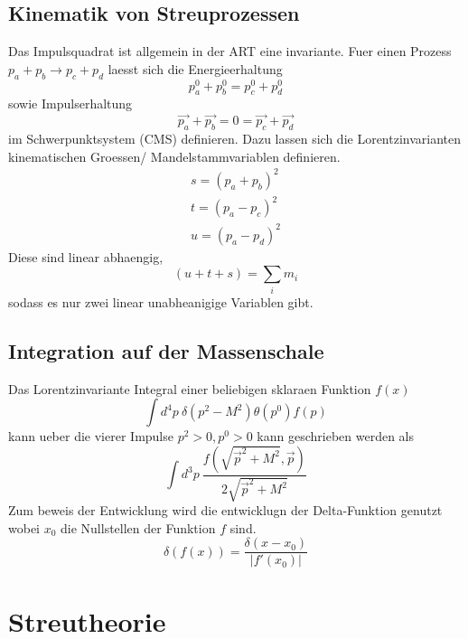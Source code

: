 \documentclass[11pt,a4paper,twocolumn]{article}
\begin{document}
\subsection{Kinematik von Streuprozessen}
Das Impulsquadrat ist allgemein in der ART eine invariante.
Fuer einen Prozess $p_a + p_b \to p_c + p_d$ laesst sich die Energieerhaltung
\begin{equation}
		p_a^0 + p_b^0 = p_c^0 + p_d^0 
\end{equation}
sowie Impulserhaltung 
\begin{equation}
		\vec{p_a} + \vec{p_b} = 0 = \vec{p_c} + \vec{p_d}
\end{equation}
im Schwerpunktsystem (CMS) definieren.
Dazu lassen sich die Lorentzinvarianten kinematischen Groessen/ 
Mandelstammvariablen definieren.
\begin{eqnarray}
		s = (p_a + p_b)^2 \\
		t = (p_a - p_c)^2 \\
		u = (p_a - p_d)^2
\end{eqnarray}
Diese sind linear abhaengig,
\begin{equation}
		(u + t + s) = \sum_i m_i
\end{equation}
sodass es nur zwei linear unabheanigige Variablen gibt.

\subsection{Integration auf der Massenschale}
Das Lorentzinvariante Integral einer beliebigen sklaraen Funktion $f(x)$ 
\begin{equation}
		\int d^4p \ \delta(p^2 -M^2) \theta(p^0) f(p)
\end{equation}
kann ueber die vierer Impulse $p^2 > 0, p^0 > 0$ kann geschrieben werden als
\begin{equation}
		\int d^3p \ \frac{f(\sqrt{\vec{p}^2 + M^2}, \vec{p})}{2\sqrt{\vec{p}^2
		+ M^2}}
\end{equation}
Zum beweis der Entwicklung wird die entwicklugn der Delta-Funktion genutzt wobei
$x_0$ die Nullstellen der Funktion $f$ sind.
\begin{equation}
		\delta(f(x)) = \frac{\delta(x-x_0)}{|f'(x_0)|}
\end{equation}

\section{Streutheorie}
\end{document}
